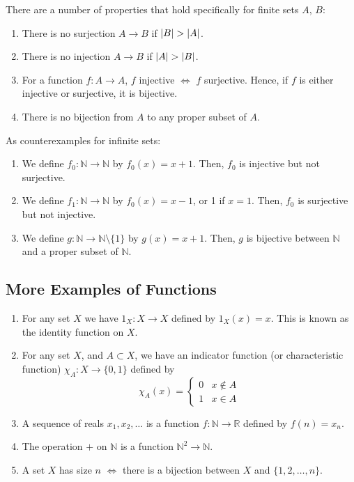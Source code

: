 \documentclass{article}
\begin{document}
There are a number of properties that hold specifically for finite sets $A$, $B$:
\begin{enumerate}
	\item There is no surjection $A \to B$ if $\abs{B} > \abs{A}$.
	\item There is no injection $A \to B$ if $\abs{A} > \abs{B}$.
	\item For a function $f\colon A \to A$, $f$ injective $\iff$ $f$ surjective. Hence, if $f$ is either injective or surjective, it is bijective.
	\item There is no bijection from $A$ to any proper subset of $A$.
\end{enumerate}
As counterexamples for infinite sets:
\begin{enumerate}
	\item We define $f_0\colon \mathbb N \to \mathbb N$ by $f_0(x) = x+1$. Then, $f_0$ is injective but not surjective.
	\item We define $f_1\colon \mathbb N \to \mathbb N$ by $f_0(x) = x-1$, or 1 if $x=1$. Then, $f_0$ is surjective but not injective.
	\item We define $g\colon \mathbb N \to \mathbb N \setminus \{ 1 \}$ by $g(x) = x+1$. Then, $g$ is bijective between $\mathbb N$ and a proper subset of $\mathbb N$.
\end{enumerate}

\subsection{More Examples of Functions}
\begin{enumerate}
	\item For any set $X$ we have $1_X\colon X \to X$ defined by $1_X(x) = x$. This is known as the identity function on $X$.
	\item For any set $X$, and $A \subset X$, we have an indicator function (or characteristic function) $\chi_A\colon X \to \{ 0, 1 \}$ defined by
	      \[ \chi_A(x) = \begin{cases}
			      0 & x \notin A \\
			      1 & x \in A
		      \end{cases} \]
	\item A sequence of reals $x_1, x_2, \dots$ is a function $f\colon \mathbb N \to \mathbb R$ defined by $f(n) = x_n$.
	\item The operation $+$ on $\mathbb N$ is a function $\mathbb N^2 \to \mathbb N$.
	\item A set $X$ has size $n$ $\iff$ there is a bijection between $X$ and $\{ 1, 2, \dots, n \}$.
\end{enumerate}
\end{document}

